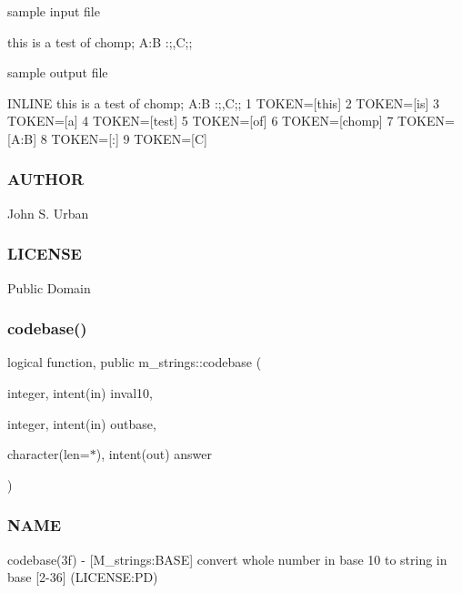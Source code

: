 sample input file \begin{DoxyVerb} this is a test of chomp; A:B :;,C;;
\end{DoxyVerb}


sample output file

I\+N\+L\+I\+NE this is a test of chomp; A\+:B \+:;,C;; 1 T\+O\+K\+EN=\mbox{[}this\mbox{]} 2 T\+O\+K\+EN=\mbox{[}is\mbox{]} 3 T\+O\+K\+EN=\mbox{[}a\mbox{]} 4 T\+O\+K\+EN=\mbox{[}test\mbox{]} 5 T\+O\+K\+EN=\mbox{[}of\mbox{]} 6 T\+O\+K\+EN=\mbox{[}chomp\mbox{]} 7 T\+O\+K\+EN=\mbox{[}A\+:B\mbox{]} 8 T\+O\+K\+EN=\mbox{[}\+:\mbox{]} 9 T\+O\+K\+EN=\mbox{[}C\mbox{]}

\subsubsection*{A\+U\+T\+H\+OR}

John S. Urban \subsubsection*{L\+I\+C\+E\+N\+SE}

Public Domain \mbox{\label{namespacem__strings_a3a022b64dc902dc6043e3f265ee78e38}} 
\subsubsection{\texorpdfstring{codebase()}{codebase()}}
{\footnotesize\ttfamily logical function, public m\+\_\+strings\+::codebase (\begin{DoxyParamCaption}\item[{integer, intent(in)}]{inval10,  }\item[{integer, intent(in)}]{outbase,  }\item[{character(len=$\ast$), intent(out)}]{answer }\end{DoxyParamCaption})}



\subsubsection*{N\+A\+ME}

codebase(3f) -\/ \mbox{[}M\+\_\+strings\+:B\+A\+SE\mbox{]} convert whole number in base 10 to string in base \mbox{[}2-\/36\mbox{]} (L\+I\+C\+E\+N\+SE\+:PD)

